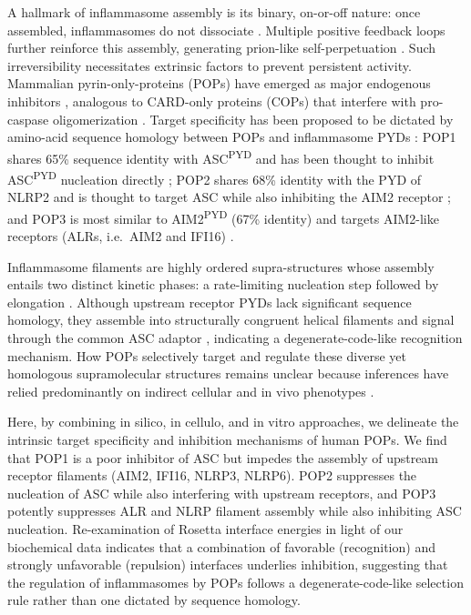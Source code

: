\documentclass[11pt]{article}
\begin{document}
A hallmark of inflammasome assembly is its binary, on-or-off nature: once assembled, inflammasomes do not dissociate \citep{cai2014,franklin2014,matyszewski2018,shen2021}. Multiple positive feedback loops further reinforce this assembly, generating prion-like self-perpetuation \citep{cai2014,matyszewski2018}. Such irreversibility necessitates extrinsic factors to prevent persistent activity. Mammalian pyrin-only-proteins (POPs) have emerged as major endogenous inhibitors \citep{dealmeida2015,khare2014,periasamy2017,ratsimandresy2017}, analogous to CARD-only proteins (COPs) that interfere with pro-caspase oligomerization \citep{devi2020,indramohan2018,lu2016}. Target specificity has been proposed to be dictated by amino-acid sequence homology between POPs and inflammasome PYDs \citep{devi2020,indramohan2018}: POP1 shares 65\% sequence identity with ASC\textsuperscript{PYD} and has been thought to inhibit ASC\textsuperscript{PYD} nucleation directly \citep{dealmeida2015}; POP2 shares 68\% identity with the PYD of NLRP2 and is thought to target ASC while also inhibiting the AIM2 receptor \citep{periasamy2017,ratsimandresy2017}; and POP3 is most similar to AIM2\textsuperscript{PYD} (67\% identity) and targets AIM2-like receptors (ALRs, i.e.\ AIM2 and IFI16) \citep{khare2014}.

Inflammasome filaments are highly ordered supra-structures whose assembly entails two distinct kinetic phases: a rate-limiting nucleation step followed by elongation \citep{kagan2014,lu2014,luwu2015,matyszewski2018}. Although upstream receptor PYDs lack significant sequence homology, they assemble into structurally congruent helical filaments and signal through the common ASC adaptor \citep{hochheiser2022a,kagan2014,lu2014,luwu2015,matyszewski2021,shen2019}, indicating a degenerate-code-like recognition mechanism. How POPs selectively target and regulate these diverse yet homologous supramolecular structures remains unclear because inferences have relied predominantly on indirect cellular and in vivo phenotypes \citep{dealmeida2015,khare2014,periasamy2017,ratsimandresy2017}.

Here, by combining in silico, in cellulo, and in vitro approaches, we delineate the intrinsic target specificity and inhibition mechanisms of human POPs. We find that POP1 is a poor inhibitor of ASC but impedes the assembly of upstream receptor filaments (AIM2, IFI16, NLRP3, NLRP6). POP2 suppresses the nucleation of ASC while also interfering with upstream receptors, and POP3 potently suppresses ALR and NLRP filament assembly while also inhibiting ASC nucleation. Re-examination of Rosetta interface energies in light of our biochemical data indicates that a combination of favorable (recognition) and strongly unfavorable (repulsion) interfaces underlies inhibition, suggesting that the regulation of inflammasomes by POPs follows a degenerate-code-like selection rule rather than one dictated by sequence homology.
\end{document}
